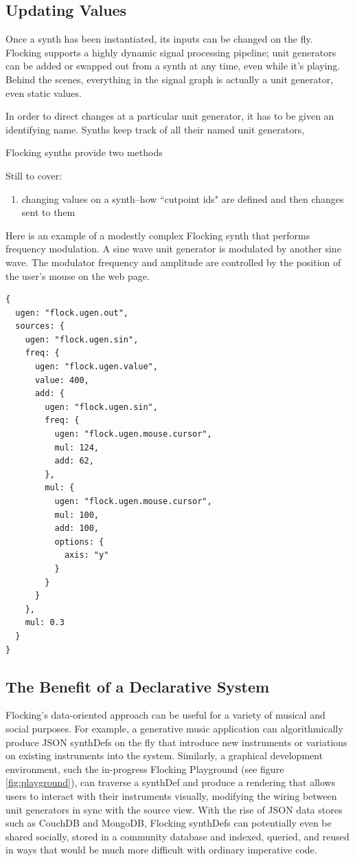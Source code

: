 \documentclass{article}
\begin{document}
\subsection{Updating Values}

Once a synth has been instantiated, its inputs can be changed on the fly. Flocking supports a highly dynamic signal processing pipeline; unit generators can be added or swapped out from a synth at any time, even while it's playing. Behind the scenes, everything in the signal graph is actually a unit generator, even static values.

In order to direct changes at a particular unit generator, it has to be given an identifying name. Synths keep track of all their named unit generators,

Flocking synths provide two methods



Still to cover:
\begin{enumerate}
\item changing values on a synth--how ``cutpoint ids" are defined and then changes sent to them
\end{enumerate}

Here is an example of a modestly complex Flocking synth that performs frequency modulation. A sine wave unit generator is modulated by another sine wave. The modulator frequency and amplitude are controlled by the position of the user's mouse on the web page.

\begin{verbatim}
{
  ugen: "flock.ugen.out",
  sources: {
    ugen: "flock.ugen.sin",
    freq: {
      ugen: "flock.ugen.value",
      value: 400,
      add: {
        ugen: "flock.ugen.sin",
        freq: {
          ugen: "flock.ugen.mouse.cursor",
          mul: 124,
          add: 62,
        },
        mul: {
          ugen: "flock.ugen.mouse.cursor",
          mul: 100,
          add: 100,
          options: {
            axis: "y"
          }
        }
      }
    },
    mul: 0.3
  }
}
\end{verbatim}

\subsection{The Benefit of a Declarative System}

Flocking's data-oriented approach can be useful for a variety of musical and social purposes. For example, a generative music application can algorithmically produce JSON synthDefs on the fly that introduce new instruments or variations on existing instruments into the system. Similarly, a graphical development environment, such the in-progress Flocking Playground (see figure \ref{fig:playground}), can traverse a synthDef and produce a rendering that allows users to interact with their instruments visually, modifying the wiring between unit generators in sync with the source view. With the rise of JSON data stores such as CouchDB and MongoDB, Flocking synthDefs can potentially even be shared socially, stored in a community database and indexed, queried, and reused in ways that would be much more difficult with ordinary imperative code.
\end{document}
